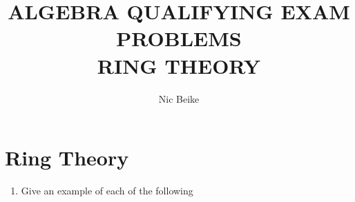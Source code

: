 \documentclass{article}
\title{ALGEBRA QUALIFYING EXAM PROBLEMS \\ RING THEORY}
\author{Nic Beike}
\theoremstyle{definition}
\begin{document}
\maketitle

\newpage

\tableofcontents

\newpage




\section{Ring Theory}

    \begin{enumerate}    

        \subsection{General Ring Theory}

            \item Give an example of each of the following
                

\end{enumerate}
\end{document}

